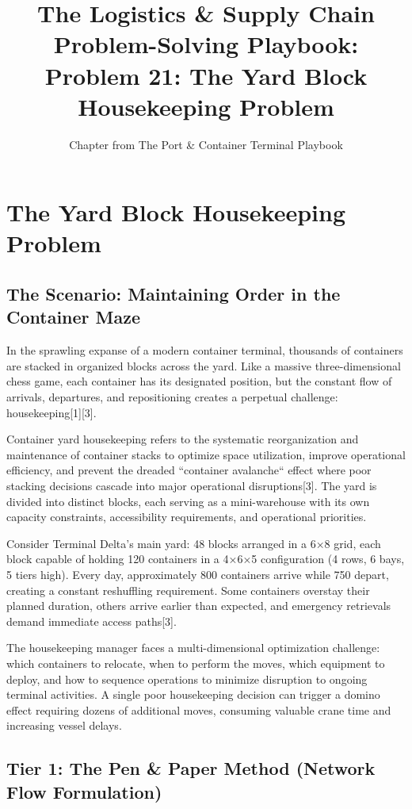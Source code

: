 \documentclass{article}
\title{The Logistics \& Supply Chain Problem-Solving Playbook:\\
Problem 21: The Yard Block Housekeeping Problem}
\author{Chapter from The Port \& Container Terminal Playbook}
\date{}
\begin{document}
\maketitle

\section{The Yard Block Housekeeping Problem}

\subsection{The Scenario: Maintaining Order in the Container Maze}

In the sprawling expanse of a modern container terminal, thousands of containers are stacked in organized blocks across the yard. Like a massive three-dimensional chess game, each container has its designated position, but the constant flow of arrivals, departures, and repositioning creates a perpetual challenge: housekeeping[1][3]. 

Container yard housekeeping refers to the systematic reorganization and maintenance of container stacks to optimize space utilization, improve operational efficiency, and prevent the dreaded ``container avalanche`` effect where poor stacking decisions cascade into major operational disruptions[3]. The yard is divided into distinct blocks, each serving as a mini-warehouse with its own capacity constraints, accessibility requirements, and operational priorities.

Consider Terminal Delta's main yard: 48 blocks arranged in a 6×8 grid, each block capable of holding 120 containers in a 4×6×5 configuration (4 rows, 6 bays, 5 tiers high). Every day, approximately 800 containers arrive while 750 depart, creating a constant reshuffling requirement. Some containers overstay their planned duration, others arrive earlier than expected, and emergency retrievals demand immediate access paths[3].

The housekeeping manager faces a multi-dimensional optimization challenge: which containers to relocate, when to perform the moves, which equipment to deploy, and how to sequence operations to minimize disruption to ongoing terminal activities. A single poor housekeeping decision can trigger a domino effect requiring dozens of additional moves, consuming valuable crane time and increasing vessel delays.

\subsection{Tier 1: The Pen \& Paper Method (Network Flow Formulation)}
\end{document}
